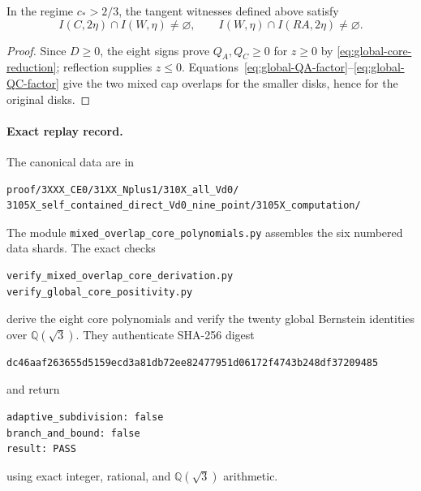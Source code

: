 \begin{lemma}
\label{lem:exact-mixed-cap-overlaps}
In the regime $c_*>2/3$, the tangent witnesses defined above satisfy
\[
 I(C,2\eta)\cap I(W,\eta)\ne\varnothing,
 \qquad
 I(W,\eta)\cap I(RA,2\eta)\ne\varnothing.
\]
\end{lemma}

\begin{proof}
Since $D\ge0$, the eight signs prove $Q_A,Q_C\ge0$ for $z\ge0$ by
\eqref{eq:global-core-reduction}; reflection supplies $z\le0$.
Equations~\eqref{eq:global-QA-factor}--\eqref{eq:global-QC-factor} give the two
mixed cap overlaps for the smaller disks, hence for the original disks.
\end{proof}

\paragraph{Exact replay record.}
The canonical data are in
\begin{verbatim}
proof/3XXX_CE0/31XX_Nplus1/310X_all_Vd0/
3105X_self_contained_direct_Vd0_nine_point/3105X_computation/
\end{verbatim}
The module \texttt{mixed\_overlap\_core\_polynomials.py} assembles the six
numbered data shards.  The exact checks
\begin{verbatim}
verify_mixed_overlap_core_derivation.py
verify_global_core_positivity.py
\end{verbatim}
derive the eight core polynomials and verify the twenty global Bernstein
identities over $\mathbb Q(\sqrt3)$.  They authenticate SHA-256 digest
\begin{verbatim}
dc46aaf263655d5159ecd3a81db72ee82477951d06172f4743b248df37209485
\end{verbatim}
and return
\begin{verbatim}
adaptive_subdivision: false
branch_and_bound: false
result: PASS
\end{verbatim}
using exact integer, rational, and $\mathbb Q(\sqrt3)$ arithmetic.
